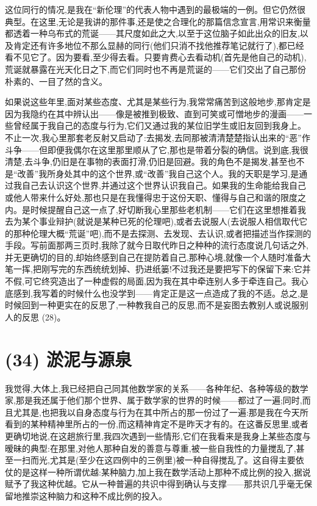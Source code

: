这位同行的情况,是我在“新伦理”的代表人物中遇到的最极端的一例。但它仍然很典型。在这里,无论是我讲的那件事,还是使之合理化的那篇信念宣言,用常识来衡量都透着一种乌布式的荒诞——其尺度如此之大,以至于这位脑子如此出众的旧友,以及肯定还有许多地位不那么显赫的同行(他们只消不找他推荐笔记就行了),都已经看不见它了。因为要看,至少得去看。只要肯费心去看动机(首先是他自己的动机),荒诞就暴露在光天化日之下,而它们同时也不再是荒诞的——它们交出了自己那份朴素的、一目了然的含义。

如果说这些年里,面对某些态度、尤其是某些行为,我常常痛苦到这般地步,那肯定是因为我隐约在其中辨认出——像是被推到极致、直到可笑或可憎地步的漫画——一些曾经属于我自己的态度与行为,它们又通过我的某位旧学生或旧友回到我身上。不止一次,我心里那套老反射又启动了:去揭发,去同那被清清楚楚指认出来的“恶”作斗争——但即便我偶尔在这里那里顺从了它,那也是带着分裂的确信。说到底,我很清楚,去斗争,仍旧是在事物的表面打滑,仍旧是回避。我的角色不是揭发,甚至也不是“改善”我所身处其中的这个世界,或“改善”我自己这个人。我的天职是学习,是通过我自己去认识这个世界,并通过这个世界认识我自己。如果我的生命能给我自己或他人带来什么好处,那也只是在我懂得忠于这份天职、懂得与自己和谐的限度之内。是时候提醒自己这一点了,好切断我心里那些老机制——它们在这里想推着我去为某个事业辩护(就说是某种已死的伦理吧),或者去说服人(去说服人相信取代它的那种伦理大概“荒诞”吧),而不是去探测、去发现、去认识,或者把描述当作探测的手段。写前面那两三页时,我除了就今日取代昨日之种种的流行态度说几句话之外,并无更确切的目的,却始终感到自己在提防着自己,那种心境,就像一个人随时准备大笔一挥,把刚写完的东西统统划掉、扔进纸篓!不过我还是要把写下的保留下来:它并不假,可它终究造出了一种虚假的局面,因为我在其中牵连别人多于牵连自己。我心底感到,我写着的时候什么也没学到——肯定正是这一点造成了我的不适。总之,是时候回到一种更实在的反思了,一种教我自己的反思,而不是妄图去教别人或说服别人的反思 (28)。

\section{(34) 淤泥与源泉}

我觉得,大体上,我已经把自己同其他数学家的关系——各种年纪、各种等级的数学家,那是我还属于他们那个世界、属于数学家的世界的时候——都过了一遍;同时,而且尤其是,也把我以自身态度与行为在其中所占的那一份过了一遍:那是我在今天所看到的某种精神里所占的一份,而这精神肯定不是昨天才有的。在这番反思里,或者更确切地说,在这趟旅行里,我四次遇到一些情形,它们在我看来是我身上某些态度与暧昧的典型:在那里,对他人那种自发的善意与尊重,被一些自我性的力量搅乱了,甚至一扫而光,尤其是(至少在这四例中的三例里)被一种自得搅乱了。这自得主要依仗的是这样一种所谓优越:某种脑力,加上我在数学活动上那种不成比例的投入,据说赋予了我这种优越。它从一种普遍的共识中得到确认与支撑——那共识几乎毫无保留地推崇这种脑力和这种不成比例的投入。

